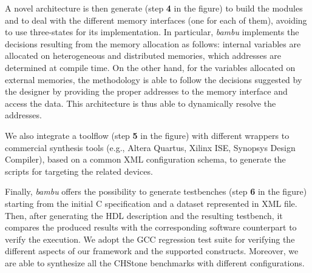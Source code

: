 A novel architecture is then generate (step {\bfseries 4} in the figure) to build the modules and to deal with the different memory interfaces (one for each of them), avoiding to use three-\/states for its implementation. In particular, {\itshape bambu} implements the decisions resulting from the memory allocation as follows\+: internal variables are allocated on heterogeneous and distributed memories, which addresses are determined at compile time. On the other hand, for the variables allocated on external memories, the methodology is able to follow the decisions suggested by the designer by providing the proper addresses to the memory interface and access the data. This architecture is thus able to dynamically resolve the addresses.

We also integrate a toolflow (step {\bfseries 5} in the figure) with different wrappers to commercial synthesis tools (e.\+g., Altera Quartus, Xilinx I\+SE, Synopsys Design Compiler), based on a common X\+ML configuration schema, to generate the scripts for targeting the related devices.

Finally, {\itshape bambu} offers the possibility to generate testbenches (step {\bfseries 6} in the figure) starting from the initial C specification and a dataset represented in X\+ML file. Then, after generating the H\+DL description and the resulting testbench, it compares the produced results with the corresponding software counterpart to verify the execution. We adopt the G\+CC regression test suite for verifying the different aspects of our framework and the supported constructs. Moreover, we are able to synthesize all the C\+H\+Stone benchmarks with different configurations. 